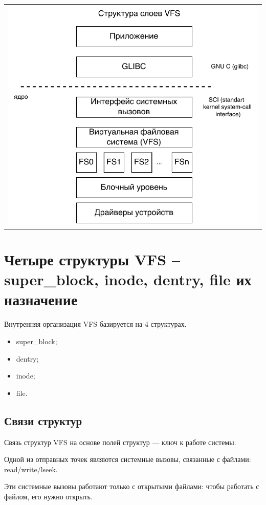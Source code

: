 \begin{table}[h!]
  \centering
  \begin{tabular}{p{1\linewidth}}
    \centering
    \includegraphics[width=0.8\linewidth]{./images/VFS_struct.pdf}
  \end{tabular}
\end{table}

\section{Четыре структуры VFS – super\_block, inode, dentry, file их назначение}

Внутренняя организация VFS базируется на 4 структурах.

\begin{itemize}
    \item super\_block;
    \item dentry;
    \item inode;
    \item file.
\end{itemize}

\subsection{Связи структур}
Связь структур VFS на основе полей структур --- ключ к работе системы.

Одной из отправных точек являются системные вызовы, связанные с файлами: read/write/lseek. 

Эти системные вызовы работают только с открытыми файлами: чтобы работать с файлом, его нужно открыть.

